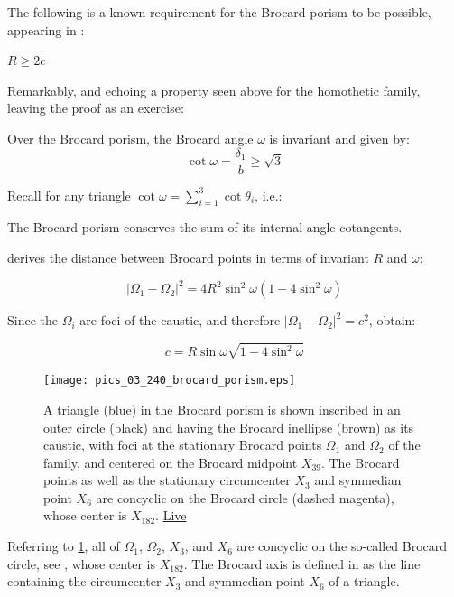 The following is a known requirement for the Brocard porism to be possible, appearing in \cite[Eqs. 15--17]{shail1996-brocard}:

\begin{corollary}
$R{\geq}2c$
\label{rem:minR}
\end{corollary}

Remarkably, and echoing a property seen above for the homothetic family, leaving the proof as an exercise:

\begin{proposition}
Over the Brocard porism, the Brocard angle $\omega$ is invariant and given by:
\[\cot\omega=\frac{\delta_1}{b} \geq \sqrt{3} \]
\label{prop:03-brocard-w}
\end{proposition}

Recall for any triangle $\cot\omega=\sum_{i=1}^3{\cot{\theta_i}}$, i.e.:

\begin{corollary}
The Brocard porism conserves the sum of its internal angle cotangents.
\end{corollary}

\cite{shail1996-brocard} derives the distance between Brocard points in terms of invariant $R$ and $\omega$:

\[ |{\Omega_1}-{\Omega_2}|^2=4 R^2\sin^2{\omega}(1-4\sin^2{\omega})
\]

Since the $\Omega_i$ are foci of the caustic, and therefore $|{\Omega_1}-{\Omega_2}|^2= c^2$, obtain:

\begin{corollary}
\[ c = R\sin{\omega}\sqrt{1-4\sin^2{\omega}} \]
\end{corollary}
 
 \begin{figure}
     \centering
     \texttt{[image: pics\_03\_240\_brocard\_porism.eps]}
     \caption{A triangle (blue) in the Brocard porism is shown inscribed in an outer circle (black) and having the Brocard inellipse (brown) as its caustic, with foci at the stationary Brocard points $\Omega_1$ and $\Omega_2$ of the family, and centered on the Brocard midpoint $X_{39}$. The Brocard points as well as the stationary circumcenter $X_3$ and symmedian point $X_6$ are concyclic on the Brocard circle (dashed magenta), whose center is $X_{182}$. \href{https://bit.ly/2QX3lEt}{Live}}
     \label{fig:03-brocard-porism}
 \end{figure}

Referring to \cref{fig:03-brocard-porism}, all of $\Omega_1$, $\Omega_2$, $X_3$, and $X_6$ are concyclic on the so-called Brocard circle, see \cite[Brocard Circle]{mw}, whose center is $X_{182}$. The Brocard axis is defined in \cite[Brocard Axis]{mw} as the line containing the circumcenter $X_3$ and symmedian point $X_6$ of a triangle.
 
